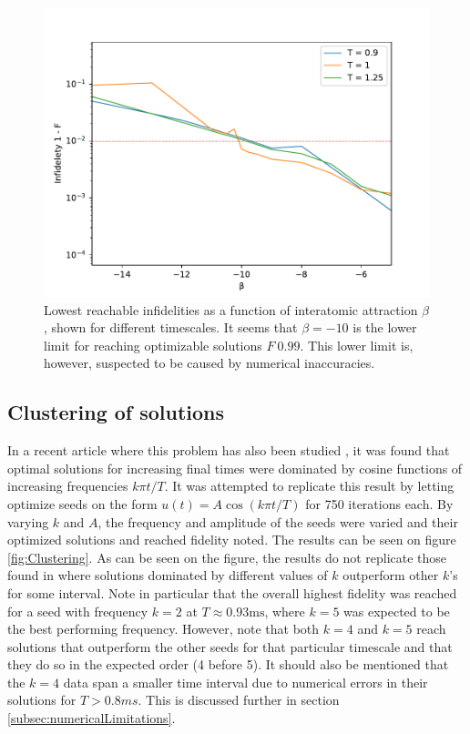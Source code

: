 \documentclass[aps,pra,reprint,superscriptaddress]{revtex4-1}
\begin{document}
\begin{figure}
	\includegraphics[width=\columnwidth]{graphics/reachable_neg_beta.pdf}
	\caption{Lowest reachable infidelities as a function of interatomic attraction $\beta$, shown for different timescales. It seems that $\beta=-10$ is the lower limit for reaching optimizable solutions $F~0.99$. This lower limit is, however, suspected to be caused by numerical inaccuracies.}
	\label{fig:reachable_neg_betas}
\end{figure}

\subsection{\label{subsec:clustering}Clustering of solutions}
In a recent article where this problem has also been studied \cite{QM2Paper}, it was found that optimal solutions for increasing final times were dominated by cosine functions of increasing frequencies $k\pi t/T$. It was attempted to replicate this result by letting  optimize seeds on the form $u(t) = A\cos(k\pi t/T)$ for 750 iterations each. By varying $k$ and $A$, the frequency and amplitude of the seeds were varied and their optimized solutions and reached fidelity noted. The results can be seen on figure \ref{fig:Clustering}. As can be seen on the figure, the results do not replicate those found in \cite{QM2Paper} where solutions dominated by different values of $k$ outperform other $k$'s for some interval. Note in particular that the overall highest fidelity was reached for a seed with frequency $k=2$ at $ T\approx 0.93 \text{ms} $, where $ k=5 $ was expected to be the best performing frequency. However, note that both $k=4$ and $k=5$ reach solutions that outperform the other seeds for that particular timescale and that they do so in the expected order (4 before 5). It should also be mentioned that the $k=4$ data span a smaller time interval due to numerical errors in their solutions for $T>0.8 ms$. This is discussed further in section \ref{subsec:numericalLimitations}. \\
\end{document}
